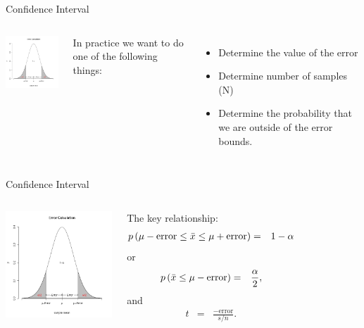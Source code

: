 \begin{frame}{Confidence Interval}

  \begin{columns}

    \centerline{\includegraphics[width=4cm]{img/confidenceInterval}}


    In practice we want to do one of the following things:
    \begin{itemize}
    \item Determine the value of the error
    \item Determine number of samples (N)
    \item Determine the probability that we are outside of the error bounds.
    \end{itemize}

  \end{columns}
  
\end{frame}


\begin{frame}{Confidence Interval}

  \begin{columns}
    \centerline{\includegraphics[width=4cm]{img/confidenceInterval}}

    The key relationship:
    \begin{eqnarray*}
      p\left( \mu-\mathrm{error} \leq \bar{x} \leq \mu + \mathrm{error}\right)
      & = & 1-\alpha
    \end{eqnarray*}
    or
    \begin{eqnarray*}
      p\left( \bar{x} \leq \mu-\mathrm{error} \right) & = & \frac{\alpha}{2},
    \end{eqnarray*}
    and
    \begin{eqnarray*}
      t & = & \frac{-\mathrm{error}}{s/n}.
    \end{eqnarray*}

  \end{columns}

\end{frame}


